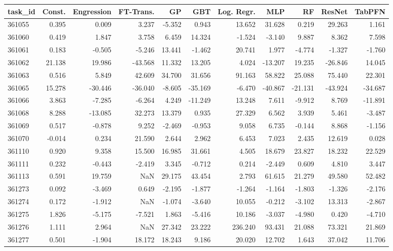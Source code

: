 \begin{tabular}{lrrrrrrrrrr}
\toprule
task\_id & Const. & Engression & FT-Trans. & GP & GBT & Log. Regr. & MLP & RF & ResNet & TabPFN \\
\midrule
361055 & 0.395 & 0.009 & 3.237 & -5.352 & 0.943 & 13.652 & 31.628 & 0.219 & 29.263 & 1.161 \\
361060 & 0.419 & 1.847 & 3.758 & 6.459 & 14.324 & -1.524 & -3.140 & 9.887 & 8.362 & 7.598 \\
361061 & 0.183 & -0.505 & -5.246 & 13.441 & -1.462 & 20.741 & 1.977 & -4.774 & -1.327 & -1.760 \\
361062 & 21.138 & 19.986 & -43.568 & 11.332 & 13.205 & 4.024 & -13.207 & 19.235 & -26.846 & 14.045 \\
361063 & 0.516 & 5.849 & 42.609 & 34.700 & 31.656 & 91.163 & 58.822 & 25.088 & 75.440 & 22.301 \\
361065 & 15.278 & -30.446 & -36.040 & -8.605 & -35.169 & -6.470 & -40.867 & -21.131 & -43.924 & -34.687 \\
361066 & 3.863 & -7.285 & -6.264 & 4.249 & -11.249 & 13.248 & 7.611 & -9.912 & 8.769 & -11.891 \\
361068 & 8.288 & -13.085 & 32.273 & 13.379 & 0.935 & 27.329 & 6.562 & 3.939 & 5.461 & -3.487 \\
361069 & 0.517 & -0.878 & 9.252 & -2.469 & -0.953 & 9.058 & 6.735 & -0.144 & 8.868 & -1.156 \\
361070 & -0.014 & 0.234 & 21.590 & 2.644 & 2.962 & 6.453 & 7.023 & 2.435 & 12.619 & 0.028 \\
361110 & 0.920 & 9.358 & 15.500 & 16.985 & 31.661 & 4.505 & 18.679 & 23.827 & 18.232 & 22.529 \\
361111 & 0.232 & -0.443 & -2.419 & 3.345 & -0.712 & 0.214 & -2.449 & 0.609 & 4.810 & 3.447 \\
361113 & 0.591 & 19.759 & NaN & 29.175 & 43.454 & 2.793 & 61.615 & 21.279 & 49.580 & 52.482 \\
361273 & 0.092 & -3.469 & 0.649 & -2.195 & -1.877 & -1.264 & -1.164 & -1.803 & -1.326 & -2.176 \\
361274 & 0.172 & -1.912 & NaN & -1.074 & -3.640 & 10.055 & -0.212 & -3.102 & 13.313 & -2.867 \\
361275 & 1.826 & -5.175 & -7.521 & 1.863 & -5.416 & 10.186 & -3.037 & -4.980 & 0.420 & -4.710 \\
361276 & 1.111 & 2.964 & NaN & 27.342 & 23.222 & 236.240 & 93.431 & 21.088 & 73.321 & 21.869 \\
361277 & 0.501 & -1.904 & 18.172 & 18.243 & 9.186 & 20.020 & 12.702 & 1.643 & 37.042 & 11.706 \\

\end{tabular}
